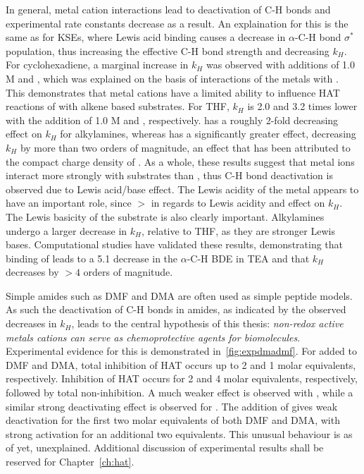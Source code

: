 In general, metal cation interactions lead to deactivation of C-H bonds and experimental rate constants decrease as a result. An explaination for this is the same as for KSEs, where Lewis acid binding causes a decrease in $\alpha$-C-H bond $\sigma^*$ population, thus increasing the effective C-H bond strength and decreasing $k_H$. For cyclohexadiene, a marginal increase in $k_H$ was observed with additions of 1.0 M  and , which was explained on the basis of interactions of the metals with \cumo. This demonstrates that metal cations have a limited ability to influence HAT reactions of \cumo with alkene based substrates. For THF, $k_H$ is 2.0 and 3.2 times lower with the addition of 1.0 M  and , respectively.  has a roughly 2-fold decreasing effect on $k_H$ for alkylamines, whereas  has a significantly greater effect, decreasing $k_H$ by more than two orders of magnitude, an effect that has been attributed to the compact charge density of . As a whole, these results suggest that metal ions interact more strongly with substrates than \cumo, thus C-H bond deactivation is observed due to Lewis acid/base effect. The Lewis acidity of the metal appears to have an important role, since  $>$  in regards to Lewis acidity and effect on $k_H$. The Lewis basicity of the substrate is also clearly important. Alkylamines undergo a larger decrease in $k_H$, relative to THF, as they are stronger Lewis bases. Computational studies have validated these results, demonstrating that binding of  leads to a 5.1 \kcalmol decrease in the $\alpha$-C-H BDE in TEA and that $k_H$ decreases by $>4$ orders of magnitude.\cite{Nova2014}

Simple amides such as DMF and DMA are often used as simple peptide models.\cite{Salamone2015a} As such the deactivation of C-H bonds in amides, as indicated by the observed decreases in $k_H$, leads to the central hypothesis of this thesis: \emph{non-redox active metals cations can serve as chemoprotective agents for biomolecules}. Experimental evidence for this is demonstrated in~\ref{fig:expdmadmf}. For  added to DMF and DMA, total inhibition of HAT occurs up to 2 and 1 molar equivalents, respectively. Inhibition of HAT occurs for 2 and 4 molar equivalents, respectively, followed by total non-inhibition. A much weaker effect is observed with , while a similar strong deactivating effect is observed for . The addition of  gives weak deactivation for the first two molar equivalents of both DMF and DMA, with strong activation for an additional two equivalents. This unusual behaviour is as of yet, unexplained. Additional discussion of experimental results shall be reserved for Chapter~\ref{ch:hat}.

